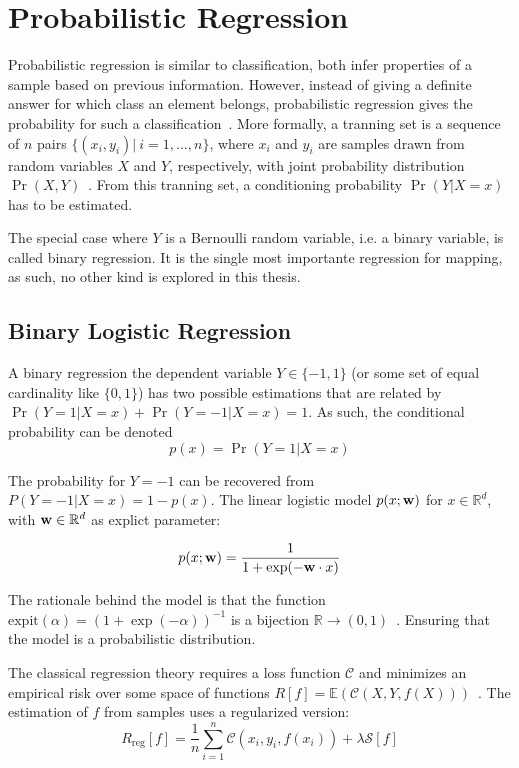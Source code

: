 
\section{Probabilistic Regression}

Probabilistic regression is similar to classification, both infer properties of
a sample based on previous information. However, instead of giving a definite
answer for which class an element belongs, probabilistic regression gives the
probability for such a classification~\cite{jaakkola1999probabilistic}. More
formally, a tranning set is a sequence of $n$ pairs
$\{(x_i,y_i)|~i=1,\ldots,n\}$, where $x_i$ and $y_i$ are samples drawn from
random variables $X$ and $Y$, respectively, with joint probability distribution
$\Pr(X,Y)$~\cite{friedman2001elements}. From this tranning set, a conditioning
probability $\Pr(Y|X=x)$ has to be estimated.

The special case where $Y$ is a Bernoulli random variable, i.e. a binary
variable, is called binary regression. It is the single most importante
regression for mapping, as such, no other kind is explored in this thesis. 

\subsection{Binary Logistic Regression} 
\label{ss:blr}
A binary regression the dependent variable $Y\in\{-1,1\}$
(or some set of equal cardinality like $\{0,1\}$) has two
possible estimations that are related by $\Pr(Y=1|X=x)+\Pr(Y=-1|X=x)=1$. As
such, the conditional probability can be denoted
\begin{equation*}
p(x) = \Pr(Y=1|X=x) 
\end{equation*}

The probability for $Y=-1$ can be recovered from $P(Y=-1|X=x)=1-p(x)$. The
linear logistic model $p(x;\mathrm{\mathbf{w}})$ for $x\in\mathbb{R}^d$, with
$\mathrm{\mathbf{w}}\in\mathbb{R}^d$ as explict parameter:

\begin{equation}
\label{eq:std_linear_logistic}
p(x;\mathrm{\mathbf{w}}) = \frac{1}{1+\exp(-\mathrm{\mathbf{w}}\cdot x)}
\end{equation}

The rationale behind the model is that the function
$\text{expit}(\alpha)=(1+\exp(-\alpha))^{-1}$ is a bijection
$\mathbb{R}\to(0,1)$~\cite{friedman2001elements}. Ensuring that the model is a
probabilistic distribution.

The classical regression theory requires a loss function $\mathscr{C}$ and
minimizes an empirical risk over some space of functions
$R[f]=\mathbb{E}(\mathscr{C}(X,Y,f(X)))$~\cite{jaakkola1999probabilistic}. The
estimation of $f$ from samples uses a regularized version:
\begin{equation}
R_{\text{reg}}[f] =
\frac{1}{n}\sum_{i=1}^n\mathscr{C}(x_i,y_i,f(x_i))+\lambda\mathcal{S}[f]
\end{equation}

